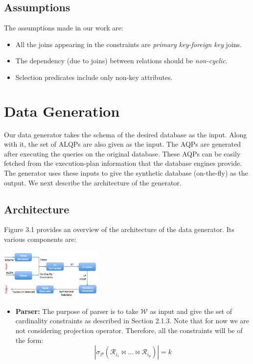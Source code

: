\documentclass[]{article}
\newenvironment{Figure}
  {\par\medskip\noindent\minipage{\linewidth}}
  {\endminipage\par\medskip}
\begin{document}
\begin{multicols}{2}
		\subsection{Assumptions}
		The assumptions made in our work are:
			\begin{itemize}
				\item All the joins appearing in the constraints are {\em primary key-foreign key} joins.
				\item The dependency (due to joins) between relations should be {\em non-cyclic}.
				\item Selection predicates include only non-key attributes.
			\end{itemize}

	\section{Data Generation}
		Our data generator takes the schema of the desired database as the input. 
		Along with it, the set of ALQPs are also given as the input. 
		The AQPs are generated after executing the queries on the original database. 
		These AQPs can be easily fetched from the execution-plan information that the database engines provide. 
		The generator uses these inputs to give the synthetic database (on-the-fly) as the output. 
		We next describe the architecture of the generator.

		\subsection{Architecture}
		Figure 3.1 provides an overview of the architecture of the data generator. 
		Its various components are:
		
		\begin{Figure}
			\centering
			\includegraphics[width=2in]{figures/architecture.png}
			\label{fig:Architecture}
		\end{Figure}
		
		\begin{itemize}
			\item {\bf Parser:} 
			The purpose of parser is to take $\mathcal{W}$ as input and give the set of cardinality constraints as described in Section 2.1.3. 
			Note that for now we are not considering projection operator. 
			Therefore, all the constraints will be of the form:
			\begin{equation*}
			| \sigma_\mathcal{P} (\mathcal{R}_{i_1} \bowtie ... \bowtie \mathcal{R}_{i_p}) | = k
			\end{equation*}
		

\end{itemize}
\end{multicols}
\end{document}
